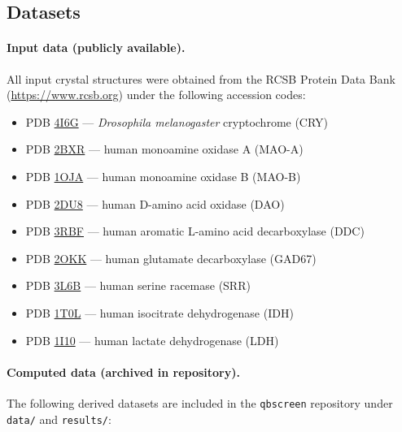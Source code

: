 \subsection*{Datasets}

\paragraph{Input data (publicly available).}
All input crystal structures were obtained from the RCSB Protein Data Bank (\url{https://www.rcsb.org}) under the following accession codes:

\begin{itemize}
\setlength{\itemsep}{0pt}
\item PDB \href{https://www.rcsb.org/structure/4I6G}{4I6G} --- \textit{Drosophila melanogaster} cryptochrome (CRY)
\item PDB \href{https://www.rcsb.org/structure/2BXR}{2BXR} --- human monoamine oxidase A (MAO-A)
\item PDB \href{https://www.rcsb.org/structure/1OJA}{1OJA} --- human monoamine oxidase B (MAO-B)
\item PDB \href{https://www.rcsb.org/structure/2DU8}{2DU8} --- human D-amino acid oxidase (DAO)
\item PDB \href{https://www.rcsb.org/structure/3RBF}{3RBF} --- human aromatic L-amino acid decarboxylase (DDC)
\item PDB \href{https://www.rcsb.org/structure/2OKK}{2OKK} --- human glutamate decarboxylase (GAD67)
\item PDB \href{https://www.rcsb.org/structure/3L6B}{3L6B} --- human serine racemase (SRR)
\item PDB \href{https://www.rcsb.org/structure/1T0L}{1T0L} --- human isocitrate dehydrogenase (IDH)
\item PDB \href{https://www.rcsb.org/structure/1I10}{1I10} --- human lactate dehydrogenase (LDH)
\end{itemize}

\paragraph{Computed data (archived in repository).}
The following derived datasets are included in the \texttt{qbscreen} repository under \texttt{data/} and \texttt{results/}:

